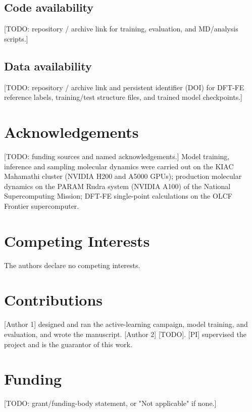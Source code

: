 \documentclass[11pt]{article}
\begin{document}
\subsection*{Code availability}
[TODO: repository / archive link for training, evaluation, and MD/analysis
scripts.]

\subsection*{Data availability}
[TODO: repository / archive link and persistent identifier (DOI) for
DFT-FE reference labels, training/test structure files, and trained model
checkpoints.]

\section*{Acknowledgements}
[TODO: funding sources and named acknowledgements.] Model training, inference
and sampling molecular dynamics were carried out on the KIAC Mahamathi cluster
(NVIDIA H200 and A5000 GPUs); production molecular dynamics on the PARAM Rudra
system (NVIDIA A100) of the National Supercomputing Mission; DFT-FE
single-point calculations on the OLCF Frontier supercomputer.

\section*{Competing Interests}
The authors declare no competing interests.

\section*{Contributions}
[Author 1] designed and ran the active-learning campaign, model training,
and evaluation, and wrote the manuscript. [Author 2] [TODO]. [PI] supervised
the project and is the guarantor of this work.

\section*{Funding}
[TODO: grant/funding-body statement, or "Not applicable" if none.]
\end{document}
